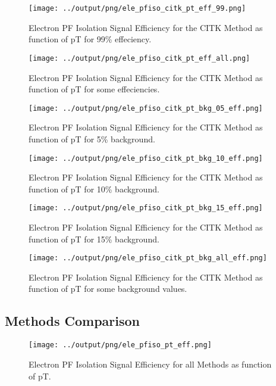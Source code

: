 \documentclass[11pt]{book}
\begin{document}
\begin{figure}[htb]
\centering
\texttt{[image: ../output/png/ele\_pfiso\_citk\_pt\_eff\_99.png]}
\caption{Electron PF Isolation Signal Efficiency for the CITK Method as function of pT for 99\% effeciency.}
\label{fig:ele_pfiso_pt_eff_citk_eff_99}
\end{figure}

\begin{figure}[htb]
\centering
\texttt{[image: ../output/png/ele\_pfiso\_citk\_pt\_eff\_all.png]}
\caption{Electron PF Isolation Signal Efficiency for the CITK Method as function of pT for some effeciencies.}
\label{fig:ele_pfiso_pt_eff_citk_eff_all}
\end{figure}

\begin{figure}[htb]
\centering
\texttt{[image: ../output/png/ele\_pfiso\_citk\_pt\_bkg\_05\_eff.png]}
\caption{Electron PF Isolation Signal Efficiency for the CITK Method as function of pT for 5\% background.}
\label{fig:ele_pfiso_pt_bkg_citk_bkg_05_eff}
\end{figure}

\begin{figure}[htb]
\centering
\texttt{[image: ../output/png/ele\_pfiso\_citk\_pt\_bkg\_10\_eff.png]}
\caption{Electron PF Isolation Signal Efficiency for the CITK Method as function of pT for 10\% background.}
\label{fig:ele_pfiso_pt_bkg_citk_bkg_10_eff}
\end{figure}

\begin{figure}[htb]
\centering
\texttt{[image: ../output/png/ele\_pfiso\_citk\_pt\_bkg\_15\_eff.png]}
\caption{Electron PF Isolation Signal Efficiency for the CITK Method as function of pT for 15\% background.}
\label{fig:ele_pfiso_pt_bkg_citk_bkg_15_eff}
\end{figure}

\begin{figure}[htb]
\centering
\texttt{[image: ../output/png/ele\_pfiso\_citk\_pt\_bkg\_all\_eff.png]}
\caption{Electron PF Isolation Signal Efficiency for the CITK Method as function of pT for some background values.}
\label{fig:ele_pfiso_pt_bkg_citk_bkg_all_eff}
\end{figure}
\clearpage

\subsection{Methods Comparison}
\begin{figure}[htb]
\centering
\texttt{[image: ../output/png/ele\_pfiso\_pt\_eff.png]}
\caption{Electron PF Isolation Signal Efficiency for all Methods as function of pT.}
\label{fig:ele_pfiso_pt_eff}
\end{figure}
\end{document}
